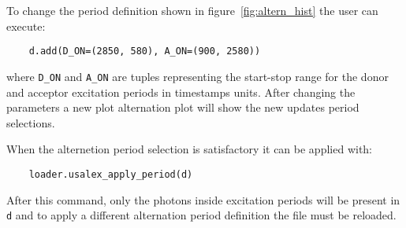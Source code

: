 To change the period definition shown in figure~\ref{fig:altern_hist}
the user can execute:

\begin{verbatim}
    d.add(D_ON=(2850, 580), A_ON=(900, 2580))
\end{verbatim}

where \verb|D_ON| and \verb|A_ON| are tuples representing 
the start-stop range for the donor and acceptor excitation periods 
in timestamps units. After changing the parameters a new plot
alternation plot will show the new updates period selections.

When the alternetion period selection is satisfactory it can
be applied with:

\begin{verbatim}
    loader.usalex_apply_period(d)
\end{verbatim}

After this command, only the photons inside excitation periods
will be present in \verb|d| and to apply a different alternation 
period definition the file must be reloaded.

